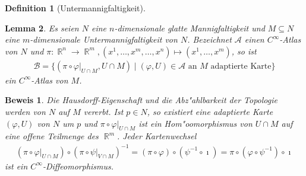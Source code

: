 \documentclass[paper=A4, twoside, chapterprefix=true, bibliography=totoc, headsepline]{scrbook}
\let\temp\phi
\let\phi\varphi
\let\varphi\temp
\let\temp\theta
\let\theta\vartheta
\let\vartheta\temp
\let\temp\epsilon
\let\epsilon\varepsilon
\let\varepsilon\temp
\let\temp\rho
\let\rho\varrho
\let\varrho\temp
\DeclareMathOperator{\R}{\mathbb{R}}
\theoremstyle{plain}
\newtheorem{Dfn}{Definition}[chapter]
\newtheorem{Lemma}[Dfn]{Lemma}
\theoremstyle{nonumberplain}
\newtheorem{bew}{Beweis}
\theoremstyle{empty}
\theoremstyle{break}
\begin{document}
\begin{Dfn}[Untermannigfaltigkeit]
\begin{center}
\end{center}

\end{Dfn}

\begin{Lemma}\label{lemma-1-5}
  Es seien $N$ eine $n$-dimensionale glatte Mannigfaltigkeit und $M \subseteq N$ eine $m$-dimensionale Untermannigfaltigkeit von $N$. Bezeichnet $\mathcal A$ einen $C^{\infty}$-Atlas von $N$ und $\pi \colon \R^n \to \R^m, (x^1, \ldots, x^m,\ldots,x^n) \mapsto (x^1, \ldots, x^m)$, so ist
  \begin{align*}
    \mathcal B = \{(\pi \circ \phi|_{U \cap M},U\cap M) \mid (\phi, U) \in \mathcal A \text{ an } M \text{ adaptierte Karte}\}
  \end{align*}
  ein $C^{\infty}$-Atlas von $M$.
\end{Lemma}

\begin{bew}
Die Hausdorff-Eigenschaft und die Abz"ahlbarkeit der Topologie werden von $N$ auf $M$ vererbt.
Ist $p \in N$, so existiert eine adaptierte Karte $(\phi,U)$ von $N$ um $p$ und $\pi \circ \phi|_{U \cap M}$ ist ein Hom"oomorphismus von $U \cap M$ auf eine offene Teilmenge des $\R^m$. Jeder Kartenwechsel
\begin{align*}
	(\pi \circ \phi|_{U \cap M}) \circ (\pi \circ \psi|_{V \cap M})^{-1} = (\pi \circ \phi) \circ (\psi^{-1} \circ \imath) = \pi \circ (\phi \circ \psi^{-1}) \circ \imath
\end{align*}
ist ein $C^{\infty}$-Diffeomorphismus.
\end{bew}
\end{document}
